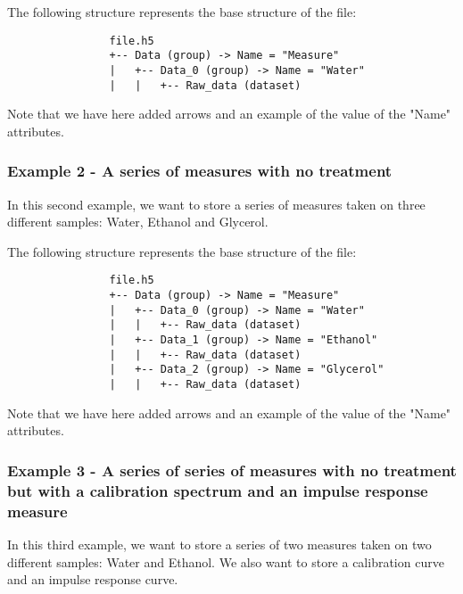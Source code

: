 \documentclass{article}
\begin{document}
            The following structure represents the base structure of the file:
            \begin{verbatim}
                file.h5
                +-- Data (group) -> Name = "Measure"
                |   +-- Data_0 (group) -> Name = "Water"
                |   |   +-- Raw_data (dataset)
            \end{verbatim}
            Note that we have here added arrows and an example of the value of the "Name" attributes.
        
        \subsubsection{Example 2 - A series of measures with no treatment}
            In this second example, we want to store a series of measures taken on three different samples: Water, Ethanol and Glycerol.

            The following structure represents the base structure of the file:
            \begin{verbatim}
                file.h5
                +-- Data (group) -> Name = "Measure"
                |   +-- Data_0 (group) -> Name = "Water"
                |   |   +-- Raw_data (dataset)
                |   +-- Data_1 (group) -> Name = "Ethanol"
                |   |   +-- Raw_data (dataset)
                |   +-- Data_2 (group) -> Name = "Glycerol"
                |   |   +-- Raw_data (dataset)
            \end{verbatim}
            Note that we have here added arrows and an example of the value of the "Name" attributes.
        
        \subsubsection{Example 3 - A series of series of measures with no treatment but with a calibration spectrum and an impulse response measure}
            In this third example, we want to store a series of two measures taken on two different samples: Water and Ethanol. We also want to store a calibration curve and an impulse response curve.
\end{document}
